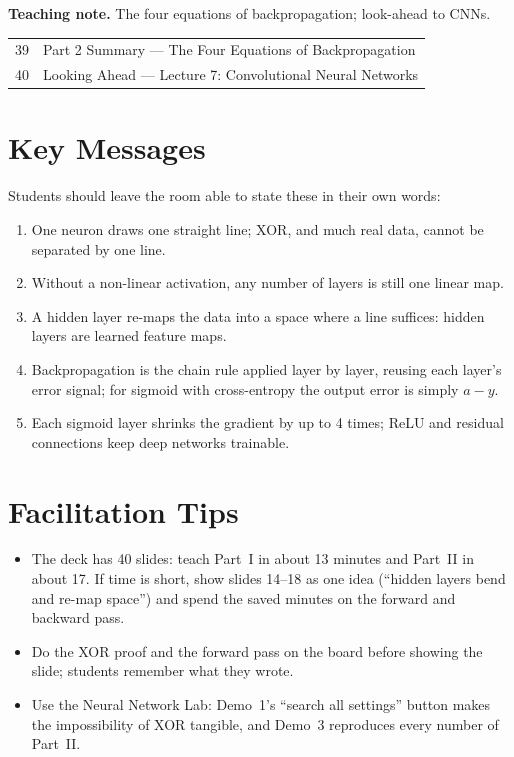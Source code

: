 \documentclass[11pt]{article}
\begin{document}
\textbf{Teaching note.} The four equations of backpropagation; look-ahead to CNNs.

\begin{center}\small\renewcommand{\arraystretch}{1.1}\begin{tabularx}{\textwidth}{@{}r X@{}}39 & Part 2 Summary --- The Four Equations of Backpropagation\\
40 & Looking Ahead --- Lecture 7: Convolutional Neural Networks\\\end{tabularx}\end{center}

\section{Key Messages}Students should leave the room able to state these in their own words:\begin{keypoint}\begin{enumerate}\item One neuron draws one straight line; XOR, and much real data, cannot be separated by one line.\item Without a non-linear activation, any number of layers is still one linear map.\item A hidden layer re-maps the data into a space where a line suffices: hidden layers are learned feature maps.\item Backpropagation is the chain rule applied layer by layer, reusing each layer's error signal; for sigmoid with cross-entropy the output error is simply $a-y$.\item Each sigmoid layer shrinks the gradient by up to 4 times; ReLU and residual connections keep deep networks trainable.\end{enumerate}\end{keypoint}

\section{Facilitation Tips}\begin{itemize}\item The deck has 40 slides: teach Part~I in about 13 minutes and Part~II in about 17. If time is short, show slides 14--18 as one idea (``hidden layers bend and re-map space'') and spend the saved minutes on the forward and backward pass.\item Do the XOR proof and the forward pass on the board before showing the slide; students remember what they wrote.\item Use the Neural Network Lab: Demo~1's ``search all settings'' button makes the impossibility of XOR tangible, and Demo~3 reproduces every number of Part~II.\end{itemize}
\end{document}
